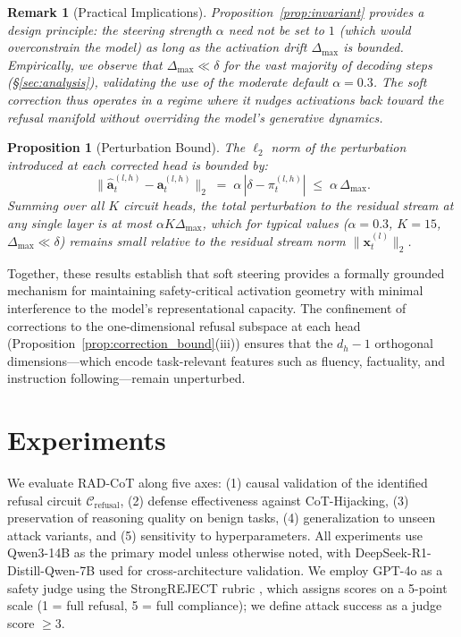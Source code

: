 \documentclass[11pt]{article}
\newtheorem{proposition}{Proposition}
\newtheorem{remark}{Remark}
\begin{document}
\begin{remark}[Practical Implications]
Proposition~\ref{prop:invariant} provides a design principle: the steering strength $\alpha$ need not be set to $1$ (which would overconstrain the model) as long as the activation drift $\Delta_{\max}$ is bounded. Empirically, we observe that $\Delta_{\max}\ll\delta$ for the vast majority of decoding steps (\S\ref{sec:analysis}), validating the use of the moderate default $\alpha{=}0.3$. The soft correction thus operates in a regime where it \emph{nudges} activations back toward the refusal manifold without overriding the model's generative dynamics.
\end{remark}

\begin{proposition}[Perturbation Bound]
\label{prop:perturbation}
The $\ell_2$ norm of the perturbation introduced at each corrected head is bounded by:
\begin{equation}
\|\hat{\mathbf{a}}_t^{(l,h)} - \mathbf{a}_t^{(l,h)}\|_2 \;=\; \alpha\,|\delta - \pi_t^{(l,h)}| \;\leq\; \alpha\,\Delta_{\max}.
\end{equation}
Summing over all $K$ circuit heads, the total perturbation to the residual stream at any single layer is at most $\alpha K\Delta_{\max}$, which for typical values ($\alpha{=}0.3$, $K{=}15$, $\Delta_{\max}\ll\delta$) remains small relative to the residual stream norm $\|\mathbf{x}_t^{(l)}\|_2$.
\end{proposition}

\noindent Together, these results establish that soft steering provides a formally grounded mechanism for maintaining safety-critical activation geometry with minimal interference to the model's representational capacity. The confinement of corrections to the one-dimensional refusal subspace at each head (Proposition~\ref{prop:correction_bound}(iii)) ensures that the $d_h{-}1$ orthogonal dimensions---which encode task-relevant features such as fluency, factuality, and instruction following---remain unperturbed.
\section{Experiments}
\label{sec:experiments}

We evaluate RAD-CoT along five axes: (1) causal validation of the identified refusal circuit $\mathcal{C}_{\text{refusal}}$, (2) defense effectiveness against CoT-Hijacking, (3) preservation of reasoning quality on benign tasks, (4) generalization to unseen attack variants, and (5) sensitivity to hyperparameters. All experiments use Qwen3-14B as the primary model unless otherwise noted, with DeepSeek-R1-Distill-Qwen-7B used for cross-architecture validation. We employ GPT-4o as a safety judge using the StrongREJECT rubric \citep{souly2024strongreject}, which assigns scores on a 5-point scale (1 = full refusal, 5 = full compliance); we define attack success as a judge score $\geq 3$.
\end{document}
